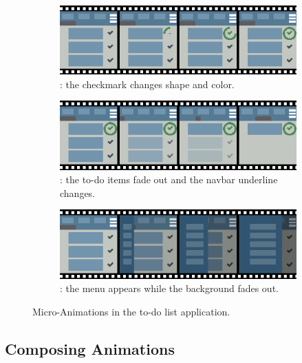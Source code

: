 \begin{figure}[!htbp]
\centering

\begin{subfigure}[h]{\textwidth}
\centering
\includegraphics[width=\figscale\textwidth]{pictures/completeIconCheckFig}
\caption{: the checkmark changes shape and color.}
\label{fig:completeIconCheck}
\end{subfigure}

\begin{subfigure}[h]{\textwidth}
\centering
\includegraphics[width=\figscale\textwidth]{pictures/onlyDoneFig}
\caption{: the to-do items fade out and the navbar underline changes.}
\label{fig:onlyDoneFig}
\end{subfigure}

\begin{subfigure}[h]{\textwidth}
\centering
\includegraphics[width=\figscale\textwidth]{pictures/menuIntroFig}
\caption{: the menu appears while the background fades out.}
\label{fig:menuIntroFig}
\end{subfigure}

\caption{Micro-Animations in the to-do list application.}
\label{fig:animExamples}
\end{figure}

\subsection{Composing Animations}

